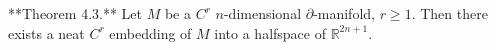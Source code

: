 **Theorem 4.3.** Let $M$ be a $C^r$ $n$-dimensional $\partial$-manifold, $r \geq 1$. Then there exists a neat $C^r$ embedding of $M$ into a halfspace of $\mathbb{R}^{2n+1}$.
